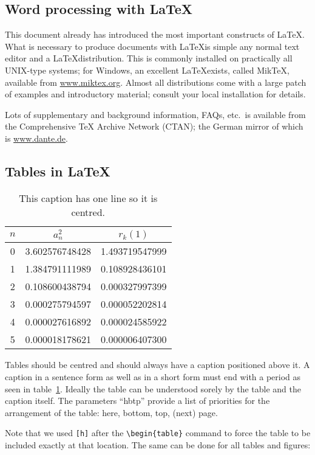 \documentclass[conference]{IEEEtran}  %
\theoremstyle{plain}
\theoremstyle{definition}
\theoremstyle{remark}
\begin{document}
\subsection{Word processing with \LaTeX}
\label{sec:model:subsec:latex}


This document already has introduced the most important constructs of \LaTeX. What is necessary to produce documents with \LaTeX is simple any normal text editor and a \LaTeX distribution. This is commonly installed on practically all UNIX-type systems; for Windows, an
excellent \LaTeX exists, called MikTeX, available from \url{www.miktex.org}. Almost all distributions come with a large patch of examples and introductory material; consult your local installation for details. 

Lots of supplementary and background information, FAQs, etc.\ is available from the Comprehensive TeX Archive Network (CTAN); the German mirror of which is \url{www.dante.de}. 

\subsection{Tables in \LaTeX}
\label{sec:model:subsec:tables}
\begin{table}[h] 
  \caption{This caption has one line so it is centred.}\label{tab:sample} 
  \centering
  \begin{tabular}{|c|c|c|}\hline
$n$ & $a_{n}^{2}$ & $r_{k}(1)$\\\hline
0 & 3.602576748428 & 1.493719547999\\\hline
1 & 1.384791111989 & 0.108928436101\\\hline
2 & 0.108600438794 & 0.000327997399\\\hline
3 & 0.000275794597 & 0.000052202814\\\hline
4 & 0.000027616892 & 0.000024585922\\\hline
5 & 0.000018178621 & 0.000006407300\\\hline
  \end{tabular}{}
\end{table}
Tables should be centred and should always have a caption positioned above it. A caption in a sentence form as well as in a short form must end with a period as seen in table~\ref{tab:sample}. Ideally the table can be understood sorely by the table and the caption itself. The parameters ``hbtp'' provide a list of priorities for the arrangement of the table: here, bottom, top, (next) page.

Note that we used \verb"[h]" after the \verb"\begin{table}" command to force the table to be included exactly at that location.  The same can be done for
all tables and figures:
\end{document}

